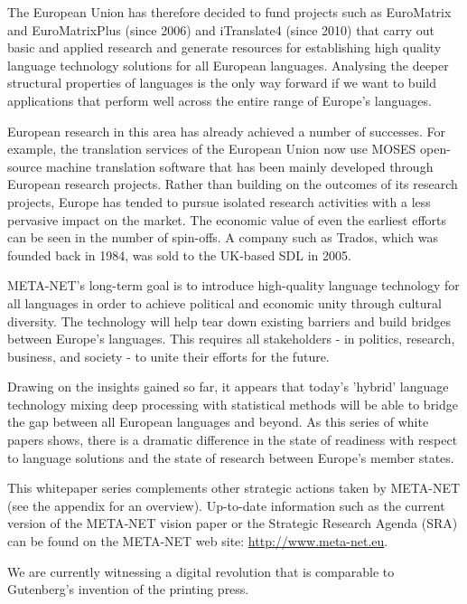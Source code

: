 \documentclass[]{../../metanetpaper}
\begin{document}
\begin{Parallel}[c]{77mm}{77mm}
{The European Union has therefore decided to fund projects such as EuroMatrix
and EuroMatrixPlus (since 2006) and iTranslate4 (since 2010) that carry out
basic and applied research and generate resources for establishing high quality
language technology solutions for all European languages. Analysing the deeper
structural properties of languages is the only way forward if we want to build
applications that perform well across the entire range of Europe’s languages.

European research in this area has already achieved a number of successes. For
example, the translation services of the European Union now use MOSES
open-source machine translation software that has been mainly developed through
European research projects. Rather than building on the outcomes of its
research projects, Europe has tended to pursue isolated research activities
with a less pervasive impact on the market. The economic value of even the
earliest efforts can be seen in the number of spin-offs. A company such as
Trados, which was founded back in 1984, was sold to the UK-based SDL in 2005.


META-NET’s long-term goal is to introduce high-quality language
technology for all languages in order to achieve political and
economic unity through cultural diversity. The technology will help
tear down existing barriers and build bridges between Europe’s
languages. This requires all stakeholders - in politics, research,
business, and society - to unite their efforts for the future.

Drawing on the insights gained so far, it appears that today’s
'hybrid' language technology mixing deep processing with statistical
methods will be able to bridge the gap between all European languages
and beyond. As this series of white papers shows, there is a dramatic
difference in the state of readiness with respect to language
solutions and the state of research between Europe’s member states.

This whitepaper series complements other strategic actions taken by
META-NET (see the appendix for an overview). Up-to-date information
such as the current version of the META-NET vision paper \cite{Vision}
or the Strategic Research Agenda (SRA) can be found on the META-NET
web site: \url{http://www.meta-net.eu}.

We are currently witnessing a digital revolution that is comparable to
Gutenberg’s invention of the printing press.
}


\end{Parallel}
\end{document}
